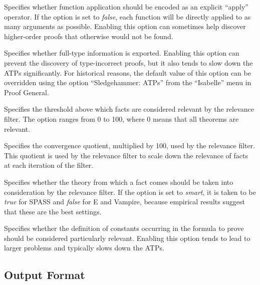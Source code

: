 \documentclass[a4paper,12pt]{article}
\begin{document}
\begin{enum}
Specifies whether function application should be encoded as an explicit
``apply'' operator. If the option is set to \textit{false}, each function will
be directly applied to as many arguments as possible. Enabling this option can
sometimes help discover higher-order proofs that otherwise would not be found.

Specifies whether full-type information is exported. Enabling this option can
prevent the discovery of type-incorrect proofs, but it also tends to slow down
the ATPs significantly. For historical reasons, the default value of this option
can be overridden using the option ``Sledgehammer: ATPs'' from the ``Isabelle''
menu in Proof General.

Specifies the threshold above which facts are considered relevant by the
relevance filter. The option ranges from 0 to 100, where 0 means that all
theorems are relevant.

Specifies the convergence quotient, multiplied by 100, used by the relevance
filter. This quotient is used by the relevance filter to scale down the
relevance of facts at each iteration of the filter.

Specifies whether the theory from which a fact comes should be taken into
consideration by the relevance filter. If the option is set to \textit{smart},
it is taken to be \textit{true} for SPASS and \textit{false} for E and Vampire,
because empirical results suggest that these are the best settings.

Specifies whether the definition of constants occurring in the formula to prove
should be considered particularly relevant. Enabling this option tends to lead
to larger problems and typically slows down the ATPs.

\end{enum}

\subsection{Output Format}
\label{output-format}
\end{document}
